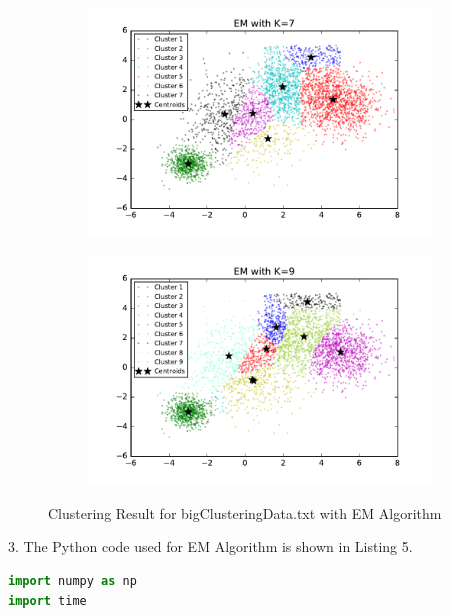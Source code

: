 \begin{description}
\begin{description}
\begin{figure}[!h]
\begin{subfigure}[b]{0.475\textwidth}
            \includegraphics[width=\textwidth]{./figures/bigClustering_EM_7.pdf}
        \end{subfigure}
        \hfill
        \begin{subfigure}[b]{0.475\textwidth}   
            \centering 
            \includegraphics[width=\textwidth]{./figures/bigClustering_EM_9.pdf}
        \end{subfigure}
        
        \caption{Clustering Result for bigClusteringData.txt with EM Algorithm}
        \label{fig:EM_bigClustering}
\end{figure}

\newpage
\item{3.} The Python code used for EM Algorithm is shown in Listing 5.

\begin{lstlisting}[language=Python, caption=EM Algorithm Python Code]
import numpy as np
import time


\end{lstlisting}
\end{description}
\end{description}
